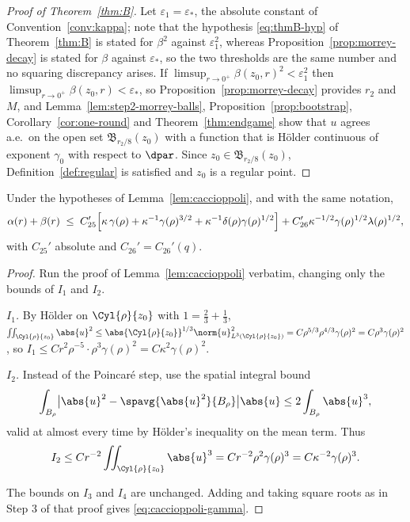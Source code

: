 \documentclass[11pt,reqno]{amsart}
\begin{document}
\begin{proof}[Proof of Theorem~\ref{thm:B}]
Let $\varepsilon_{1}=\varepsilon_{*}$, the absolute constant of
Convention~\ref{conv:kappa}; note that the hypothesis \eqref{eq:thmB-hyp} of
Theorem~\ref{thm:B} is stated for $\beta^{2}$ against $\varepsilon_{1}^{2}$,
whereas Proposition~\ref{prop:morrey-decay} is stated for $\beta$ against
$\varepsilon_{*}$, so the two thresholds are the same number and no squaring
discrepancy arises. If
$\limsup_{r\to0^{+}}\beta(z_{0},r)^{2}<\varepsilon_{1}^{2}$ then
$\limsup_{r\to0^{+}}\beta(z_{0},r)<\varepsilon_{*}$, so
Proposition~\ref{prop:morrey-decay} provides $r_{2}$ and $M$, and
Lemma~\ref{lem:step2-morrey-balls}, Proposition~\ref{prop:bootstrap},
Corollary~\ref{cor:one-round} and Theorem~\ref{thm:endgame} show that $u$
agrees a.e.\ on the open set $\mathfrak{B}_{r_{2}/8}(z_{0})$ with a function
that is H\"older continuous of exponent $\gamma_{0}$ with respect to $\dpar$.
Since $z_{0}\in\mathfrak{B}_{r_{2}/8}(z_{0})$, Definition~\ref{def:regular} is
satisfied and $z_{0}$ is a regular point.
\end{proof}

\begin{lemma}\label{lem:caccioppoli-gamma}
Under the hypotheses of Lemma~\ref{lem:caccioppoli}, and with the same notation,
\begin{equation}\label{eq:caccioppoli-gamma}
  \alpha(r)+\beta(r)\;\le\;
    C_{25}'\Bigl[\kappa\,\gamma(\rho)+\kappa^{-1}\gamma(\rho)^{3/2}
      +\kappa^{-1}\delta(\rho)\gamma(\rho)^{1/2}\Bigr]
   +C_{26}'\kappa^{-1/2}\gamma(\rho)^{1/2}\lambda(\rho)^{1/2},
\end{equation}
with $C_{25}'$ absolute and $C_{26}'=C_{26}'(q)$.
\end{lemma}

\begin{proof}
Run the proof of Lemma~\ref{lem:caccioppoli} verbatim, changing only the bounds
of $I_{1}$ and $I_{2}$.

\emph{$I_{1}$.} By H\"older on $\Cyl{\rho}{z_{0}}$ with $1=\tfrac23+\tfrac13$,
$\iint_{\Cyl{\rho}{z_{0}}}\abs{u}^{2}
 \le\abs{\Cyl{\rho}{z_{0}}}^{1/3}\norm{u}^{2}_{L^{3}(\Cyl{\rho}{z_{0}})}
 =C\rho^{5/3}\rho^{4/3}\gamma(\rho)^{2}=C\rho^{3}\gamma(\rho)^{2}$, so
$I_{1}\le C r^{2}\rho^{-5}\cdot\rho^{3}\gamma(\rho)^{2}=C\kappa^{2}\gamma(\rho)^{2}$.

\emph{$I_{2}$.} Instead of the Poincar\'e step, use the spatial integral bound
\[\int_{B_{\rho}}\bigl|\abs{u}^{2}-\spavg{\abs{u}^{2}}{B_{\rho}}\bigr|\abs{u}\le2\int_{B_{\rho}}\abs{u}^{3},\]
valid at almost every time by H\"older's inequality on the mean term. Thus
\[
I_{2}\le Cr^{-2}\iint_{\Cyl{\rho}{z_{0}}}\abs{u}^{3}
 =Cr^{-2}\rho^{2}\gamma(\rho)^{3}=C\kappa^{-2}\gamma(\rho)^{3}
.
\]

The bounds on $I_{3}$ and $I_{4}$ are unchanged. Adding and taking square roots
as in Step 3 of that proof gives \eqref{eq:caccioppoli-gamma}.
\end{proof}
\end{document}
